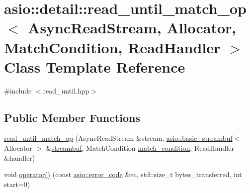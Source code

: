 \hypertarget{classasio_1_1detail_1_1read__until__match__op}{}\section{asio\+:\+:detail\+:\+:read\+\_\+until\+\_\+match\+\_\+op$<$ Async\+Read\+Stream, Allocator, Match\+Condition, Read\+Handler $>$ Class Template Reference}
\label{classasio_1_1detail_1_1read__until__match__op}


{\ttfamily \#include $<$read\+\_\+until.\+hpp$>$}

\subsection*{Public Member Functions}
\begin{DoxyCompactItemize}
\item 
\hyperlink{classasio_1_1detail_1_1read__until__match__op_a77d0200631728a1df9bb388df5f67a82}{read\+\_\+until\+\_\+match\+\_\+op} (Async\+Read\+Stream \&stream, \hyperlink{classasio_1_1basic__streambuf}{asio\+::basic\+\_\+streambuf}$<$ Allocator $>$ \&\hyperlink{namespaceasio_a6a7ba348943527312eeace3492bf32ee}{streambuf}, Match\+Condition \hyperlink{group__async__read__until_ga950b81fb954e4a0f01e13a57e15721b4}{match\+\_\+condition}, Read\+Handler \&handler)
\item 
void \hyperlink{classasio_1_1detail_1_1read__until__match__op_a2b8f2a879ae13c19908522a3435daa06}{operator()} (const \hyperlink{classasio_1_1error__code}{asio\+::error\+\_\+code} \&ec, std\+::size\+\_\+t bytes\+\_\+transferred, int start=0)
\end{DoxyCompactItemize}
